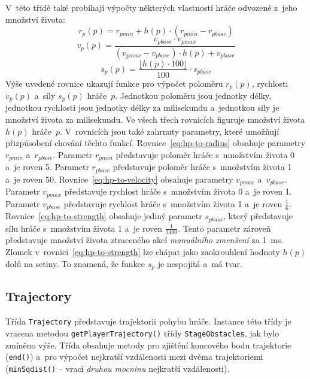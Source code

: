 V~této třídě také probíhají výpočty některých vlastností hráče odvozené z~jeho množství života:
\begin{equation}
    \label{eq:hp-to-radius}
    r_p(p) = r_{pmin} + h(p) \cdot (r_{pmin} - r_{pbase})
\end{equation}
\begin{equation}
    \label{eq:hp-to-velocity}
    v_p(p) = \frac{v_{pbase} \cdot v_{pmax}}{(v_{pmax} - v_{pbase}) \cdot h(p) + v_{pbase}}
\end{equation}
\begin{equation}
    \label{eq:hp-to-strength}
    s_p(p) = \frac{\lfloor h(p) \cdot 100 \rfloor}{100} \cdot s_{pbase}
\end{equation}
Výše uvedené rovnice ukazují funkce pro výpočet poloměru $r_p(p)$, rychlosti $v_p(p)$ a~síly $s_p(p)$ hráče~$p$. Jednotkou poloměru jsou jednotky délky, jednotkou rychlosti jsou jednotky délky za milisekundu a~jednotkou síly je množství života za milisekundu. Ve všech třech rovnicích figuruje množství života $h(p)$ hráče~$p$. V~rovnicích jsou také zahrnuty parametry, které umožňují přizpůsobení chování těchto funkcí. Rovnice~\eqref{eq:hp-to-radius} obsahuje parametry $r_{pmin}$ a~$r_{pbase}$. Parametr $r_{pmin}$ představuje poloměr hráče s~množstvím života 0 a~je roven 5. Parametr $r_{pbase}$ představuje poloměr hráče s~množstvím života 1 a~je roven 50. Rovnice~\eqref{eq:hp-to-velocity} obsahuje parametry $v_{pmax}$ a~$v_{pbase}$. Parametr $v_{pmax}$ představuje rychlost hráče s~množstvím života 0 a~je roven 1. Parametr $v_{pbase}$ představuje rychlost hráče s~množstvím života 1 a~je roven $\frac{1}{6}$. Rovnice~\eqref{eq:hp-to-strength} obsahuje jediný parametr $s_{pbase}$, který představuje sílu hráče s~množstvím života 1 a~je roven $\frac{1}{3400}$. Tento parametr zároveň představuje množství života ztraceného akcí \emph{manuálního zmenšení} za 1
\,ms. Zlomek v~rovnici~\eqref{eq:hp-to-strength} lze chápat jako zaokrouhlení hodnoty $h(p)$ dolů na setiny. To znamená, že funkce $s_p$ je nespojitá a~má  tvar.

\subsection*{Trajectory}

Třída \texttt{Trajectory} představuje trajektorii pohybu hráče. Instance této třídy je vracena metodou \texttt{getPlayerTrajectory()} třídy \texttt{StageObstacles}, jak bylo zmíněno výše. Třída obsahuje metody pro zjištění koncového bodu trajektorie (\texttt{end()}) a~pro výpočet nejkratší vzdálenosti mezi dvěma trajektoriemi (\texttt{minSqdist()} -- vrací \emph{druhou mocninu} nejkratší vzdálenosti).


